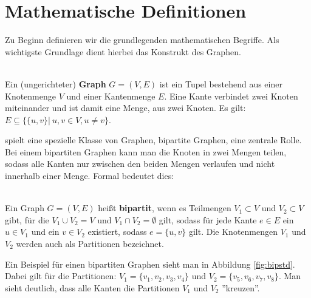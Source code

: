 



\section{Mathematische Definitionen}
Zu Beginn definieren wir die grundlegenden mathematischen Begriffe. Als wichtigste Grundlage dient 
hierbei das Konstrukt des  Graphen.
\begin{definition}[Graph] ~\\
Ein (ungerichteter) \textbf{Graph} $G = (V,E)$ ist ein Tupel bestehend aus einer Knotenmenge $V$ und einer Kantenmenge
 $E$. Eine Kante verbindet zwei Knoten miteinander und ist damit eine Menge, aus zwei Knoten.
 Es gilt: $E \subseteq \{ \{u,v\} |\ u,v \in V, u \neq v \}$.  
\end{definition}
 spielt eine spezielle Klasse von Graphen, bipartite Graphen, eine zentrale Rolle.
Bei einem bipartiten Graphen kann man die Knoten in zwei Mengen teilen, sodass alle Kanten nur zwischen den 
beiden Mengen verlaufen und nicht innerhalb einer Menge. Formal bedeutet dies:
\begin{definition} ~\\
Ein Graph $G=(V,E)$ heißt \textbf{bipartit}, wenn es Teilmengen $V_1 \subset V$ und $V_2 \subset V$ gibt, für die 
$V_1 \cup V_2 = V$ und $V_1 \cap V_2 = \emptyset$ gilt,
 sodass für jede Kante $e \in E$ ein $u \in V_1$ und ein $v \in V_2$ existiert, sodass $e = \{u,v\}$ gilt.
Die Knotenmengen $V_1$ und $V_2$ werden auch als Partitionen bezeichnet.
\end{definition}

\noindent
Ein Beispiel für einen bipartiten Graphen sieht man in Abbildung \ref{fig:bipstd}. Dabei gilt für die Partitionen:
$V_1 = \{v_1,v_2,v_3,v_4\}$ und $V_2 = \{v_5,v_6,v_7,v_8\}$. Man sieht deutlich, dass alle Kanten die Partitionen
$V_1$ und $V_2$ ''kreuzen''.

